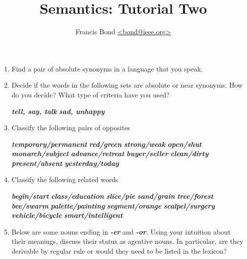 \documentclass[a4paper]{article}
\title{Semantics: Tutorial Two}
\author{Francis Bond \url{<bond@ieee.org>}}
\date{}%
\newcommand{\lex}[1]{\textbf{\textit{#1}}}
\begin{document}
\maketitle

\begin{enumerate}
  \item Find a pair of absolute synonyms in a language that you speak.  

  \item Decide if the words in the following sets are absolute or 
near synonyms. How do you decide? What
type of criteria have you used?
\begin{exe}
  \ex \lex{tell, say, talk} 
  \ex \lex{sad, unhappy} 
\end{exe}

\item  Classify the following pairs of opposites
\begin{multicols}{2}
\begin{exe}
  \ex \lex{temporary/permanent} 
  \ex \lex{red/green} 
  \ex \lex{strong/weak} 
  \ex \lex{open/shut} 
  \ex \lex{monarch/subject} 
  \ex \lex{advance/retreat} 
  \ex \lex{buyer/seller} 
  \ex \lex{clean/dirty} 
  \ex \lex{present/absent} 
  \ex \lex{yesterday/today} 
\end{exe}
\end{multicols}

\item  Classify the following related words
\begin{multicols}{2}
\begin{exe}
  \ex \lex{begin/start} 
  \ex \lex{class/education} 
  \ex \lex{slice/pie} 
  \ex \lex{sand/grain} 
  \ex \lex{tree/forest} 
  \ex \lex{bee/swarm} 
  \ex \lex{palette/painting} 
  \ex \lex{segment/orange} 
  \ex \lex{scalpel/surgery} 
  \ex \lex{vehicle/bicycle} 
  \ex \lex{smart/intelligent} 
\end{exe}
\end{multicols}


\item  Below are some nouns ending in \lex{-er} and \lex{-or}. Using your intuition
about their meanings, discuss their status as agentive nouns. In
particular, are they derivable by regular rule or would they need to
be listed in the lexicon?  


\end{enumerate}
\end{document}

